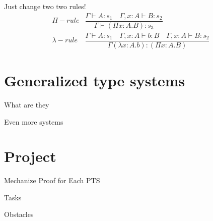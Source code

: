 \documentclass{beamer}
\begin{document}
\begin{frame}{Just change two two rules!}
    \[
    \begin{array}{lc}
\Pi{-}rule & \dfrac{\Gamma \vdash A : s_1\quad \Gamma, x : A \vdash B : s_2}{\Gamma \vdash (\Pi x : A . B) : s_3} \\[1cm]
\lambda{-}rule &\dfrac{\Gamma \vdash A : s_1\quad \Gamma, x : A \vdash b : B\quad \Gamma, x : A \vdash B : s_2}{\Gamma (\lambda x: A .b) : (\Pi x : A . B)}
\end{array}
    \]
\end{frame}

\section{Generalized type systems}

\begin{frame}{What are they}
    
\end{frame}

\begin{frame}{Even more systems}
    
\end{frame}

\section{Project}

\begin{frame}{Mechanize Proof for Each PTS}
    
\end{frame}

\begin{frame}{Tasks}
    
\end{frame}

\begin{frame}{Obstacles}
    
\end{frame}
\end{document}
